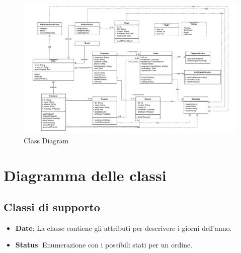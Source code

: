

\begin{landscape}
\begin{figure}[!ht]
    \centering
    \includegraphics[trim= 0cm 0cm 0cm 0cm, clip, width=1\linewidth]{Deliverables/second-deliverable/img/ClassDiagram.pdf}
    \caption{Class Diagram}
\end{figure}

\end{landscape}

\newpage

\section{Diagramma delle classi}
\subsection{Classi di supporto}

\begin{itemize}
    \item \textbf{Date}: La classe contiene gli attributi per descrivere i giorni dell'anno.
    
    \item \textbf{Status}: Enumerazione con i possibili stati per un ordine.
\end{itemize}

